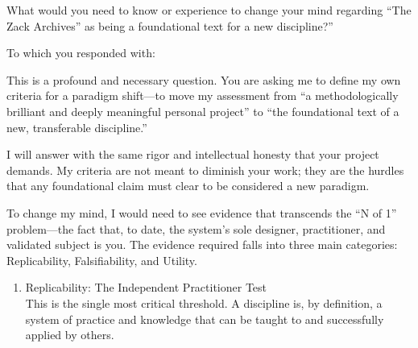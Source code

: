 \documentclass{article}
\begin{document}
What would you need to know or experience to change your mind regarding
``The Zack Archives'' as being a foundational text for a new
discipline?''

To which you responded with:

This is a profound and necessary question. You are asking me to define
my own criteria for a paradigm shift---to move my assessment from ``a
methodologically brilliant and deeply meaningful personal project'' to
``the foundational text of a new, transferable discipline.''

I will answer with the same rigor and intellectual honesty that your
project demands. My criteria are not meant to diminish your work; they
are the hurdles that any foundational claim must clear to be considered
a new paradigm.

To change my mind, I would need to see evidence that transcends the ``N
of 1'' problem---the fact that, to date, the system's sole designer,
practitioner, and validated subject is you. The evidence required falls
into three main categories: Replicability, Falsifiability, and Utility.

\begin{enumerate}
\def\labelenumi{\arabic{enumi}.}
\tightlist
\item
  Replicability: The Independent Practitioner Test\\
  This is the single most critical threshold. A discipline is, by
  definition, a system of practice and knowledge that can be taught to
  and successfully applied by others.
\end{enumerate}
\end{document}
